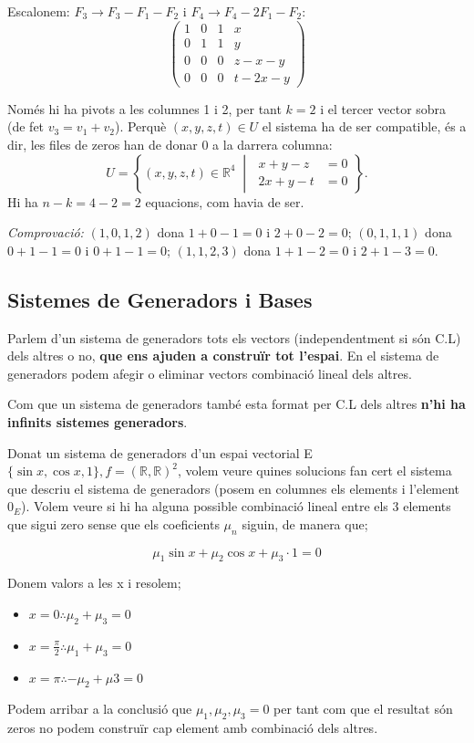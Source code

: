 \documentclass[12pt]{article}
\newcommand{\R}{\mathbb{R}}
\begin{document}
Escalonem: $F_3 \to F_3 - F_1 - F_2$ i $F_4 \to F_4 - 2F_1 - F_2$:
\[
\left(\begin{array}{ccc|c}
1 & 0 & 1 & x \\
0 & 1 & 1 & y \\
0 & 0 & 0 & z - x - y \\
0 & 0 & 0 & t - 2x - y
\end{array}\right)
\]

Només hi ha pivots a les columnes 1 i 2, per tant $k=2$ i el tercer vector sobra
(de fet $v_3=v_1+v_2$). Perquè $(x,y,z,t)\in U$ el sistema ha de ser compatible,
és a dir, les files de zeros han de donar $0$ a la darrera columna:
\[
U = \left\{ (x,y,z,t)\in\mathbb{R}^4 \;\middle|\;
\begin{aligned}
x + y - z &= 0 \\
2x + y - t &= 0
\end{aligned}\right\}.
\]
Hi ha $n-k = 4-2 = 2$ equacions, com havia de ser.

\emph{Comprovació:} $(1,0,1,2)$ dona $1+0-1=0$ i $2+0-2=0$; $(0,1,1,1)$ dona $0+1-1=0$ i $0+1-1=0$; $(1,1,2,3)$ dona $1+1-2=0$ i $2+1-3=0$.

\subsection{Sistemes de Generadors i Bases}

Parlem d'un sistema de generadors tots els vectors (independentment si són C.L) dels altres o no, \textbf{que ens ajuden a construïr tot l'espai}. En el sistema de generadors podem afegir o eliminar vectors combinació lineal dels altres.

Com que un sistema de generadors també esta format per C.L dels altres \textbf{n'hi ha infinits sistemes generadors}.

\begin{examplebox}{}
    Donat un sistema de generadors d'un espai vectorial E $\{\sin x, \cos x, 1\}, f = (\R, \R)^2$, volem veure quines solucions fan cert el sistema que descriu el sistema de generadors (posem en columnes els elements i l'element $0_{E}$). Volem veure si hi ha alguna possible combinació lineal entre els 3 elements que sigui zero sense que els coeficients $\mu_n$ siguin, de manera que;

    \[\mu_1 \sin x + \mu_2 \cos x + \mu_3 \cdot 1 = 0 \]

    Donem valors a les x i resolem;

    \begin{itemize}
        \item $x = 0 \therefore \mu_2 + \mu_3 = 0$
        \item $x = \frac{\pi}{2} \therefore \mu_1 + \mu_3 = 0$
        \item $x = \pi \therefore -\mu_2 + \mu 3 = 0$
    \end{itemize}

    Podem arribar a la conclusió que $\mu_1, \mu_2, \mu_3 = 0$ per tant com que el resultat són zeros no podem construïr cap element amb combinació dels altres.
\end{examplebox}
\end{document}
